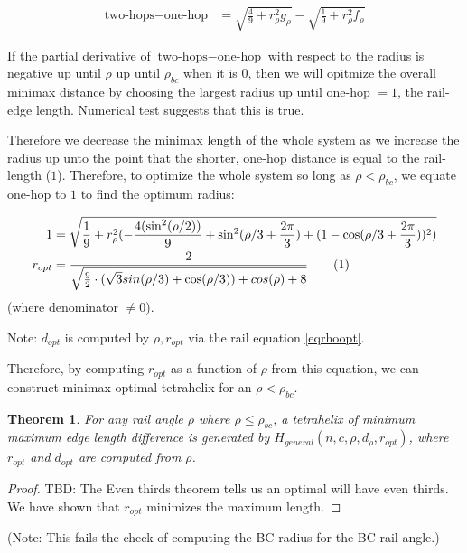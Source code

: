 \documentclass[11pt]{article}
\newtheorem{theorem}{Theorem}
\newcommand\numberthis{\addtocounter{equation}{1}\tag{\theequation}}
\begin{document}
\begin{align*}
  \text{two-hops} - \text{one-hop}  &= \sqrt{\frac{4}{9} + r_{\rho}^2g_{\rho}} - \sqrt{\frac{1}{9} + r_{\rho}^2f_{\rho}} 
\end{align*}

If the partial derivative of $\text{two-hops} - \text{one-hop}$ with respect to the
radius is negative up until $\rho$ up until $\rho_{bc}$ when it is $0$, then
we will opitmize the overall minimax distance by choosing the largest radius
up until one-hop $= 1$, the rail-edge length. Numerical test suggests that this is true.


Therefore we decrease the minimax length
of the whole system as we increase the radius
up unto the point that the shorter, one-hop distance is equal to the rail-length ($1$).
Therefore, to optimize the whole system so long as $\rho < \rho_{bc}$,
we equate one-hop to $1$ to find the optimum radius:


\begin{align*}
  1 &=  \sqrt{\frac{1}{9}  + r_{\rho}^2(-\frac{4 (\sin^2( \rho / 2))}{9} + \sin^2(\rho/3+ \frac{2\pi}{3})  + (1 - \cos(\rho/3 + \frac{2\pi}{3}))^2)} \\
  r_{opt} &= \frac{2}{\sqrt{\frac{9}{2} \cdot ( \sqrt{3} sin(\rho/3) + \cos(\rho/3)) + cos(\rho)+ 8 }} \numberthis  \label{eqrhoopt} \\
\end{align*}
(where denominator $  \neq 0$).

Note: $ d_{opt} $ is computed by $\rho, r_{opt}$ via the rail equation \eqref{eqrhoopt}.

Therefore, by computing $r_{opt}$ as a function of $\rho$ from this equation, we can construct minimax optimal tetrahelix for an $\rho < \rho_{bc}$.

\begin{theorem}
  \label{optimality}
  For any rail angle $\rho$ where $\rho \leq \rho_{bc}$, a tetrahelix of minimum maximum edge length
  difference is generated by $H_{general}(n,c,\rho,d_{\rho},r_{opt})$, where $r_{opt}$ and $d_{opt}$ are
  computed from $\rho$. 
\end{theorem}

\begin{proof}
  TBD: The Even thirds theorem tells us an optimal will have even thirds.  We have shown
  that $r_{opt}$ minimizes the maximum length.
  \end{proof}

(Note: This fails the check of computing the BC radius for the BC rail angle.)
\end{document}
